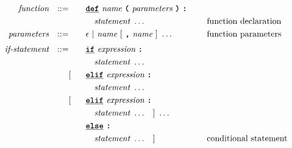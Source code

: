 \begin{alignat*}{9}
&& \textit{function} && ::=&\quad && \textbf{\texttt{\underline{def}}}\  \textit{name} \ 
                                   \textbf{\texttt{(}}\  \textit{parameters} \ \textbf{\texttt{)}} \
                                   \textbf{\texttt{:}} \ \quad
                                                           && \\         
&&                       &&     &\quad && \quad \textit{statement} \ \ldots \quad
                                                           && \textrm{function declaration}\\                                                           
&& \textit{parameters}   && ::= &\quad &&  \epsilon\ | \  \textit{name} \ 
                                                   [\ \textbf{\texttt{,}} \ \textit{name}\ ]\ \ldots
                                                            && \textrm{function parameters}   \\[1mm]
&& \textit{if-statement} && ::= &\quad &&  \textbf{\texttt{\underline{if}}}\ \textit{expression} \ 
                                           \textbf{\texttt{:}}  \\
&&                       &&     &\quad && \quad \textit{statement} \ \ldots \quad
                                                           &&  \\  
&&                       &&     &      [&& \textbf{\texttt{\underline{elif}}} \ \textit{expression} \
                                          \textbf{\texttt{:}} \\ 
&&                       &&     &\quad && \quad \textit{statement} \ \ldots \quad
                                                           &&  \\
&&                       &&     &      [&& \textbf{\texttt{\underline{elif}}} \ \textit{expression} \
                                          \textbf{\texttt{:}} \\ 
&&                       &&     &\quad && \quad \textit{statement} \ \ldots \quad ] \ \ldots \quad 
                                                           &&  \\     
&&                       &&     &      && \textbf{\texttt{\underline{else}}}\
                                          \textbf{\texttt{:}} \\
&&                       &&     &\quad && \quad \textit{statement} \ \ldots \quad ]
                                                           && \textrm{conditional statement}  \\[1mm]

\end{alignat*}
